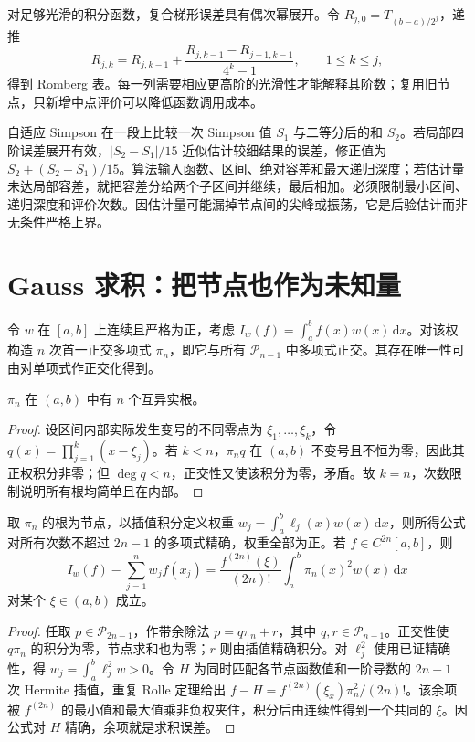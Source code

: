 \documentclass[UTF8,12pt,a4paper,fontset=fandol]{ctexbook}
\begin{document}
对足够光滑的积分函数，复合梯形误差具有偶次幂展开。令 $R_{j,0}=T_{(b-a)/2^j}$，递推
\[
 R_{j,k}=R_{j,k-1}+\frac{R_{j,k-1}-R_{j-1,k-1}}{4^k-1},\qquad1\le k\le j,
\]
得到 Romberg 表。每一列需要相应更高阶的光滑性才能解释其阶数；复用旧节点，只新增中点评价可以降低函数调用成本。

自适应 Simpson 在一段上比较一次 Simpson 值 $S_1$ 与二等分后的和 $S_2$。若局部四阶误差展开有效，$|S_2-S_1|/15$ 近似估计较细结果的误差，修正值为 $S_2+(S_2-S_1)/15$。算法输入函数、区间、绝对容差和最大递归深度；若估计量未达局部容差，就把容差分给两个子区间并继续，最后相加。必须限制最小区间、递归深度和评价次数。因估计量可能漏掉节点间的尖峰或振荡，它是后验估计而非无条件严格上界。

\section{Gauss 求积：把节点也作为未知量}
令 $w$ 在 $[a,b]$ 上连续且严格为正，考虑 $I_w(f)=\int_a^bf(x)w(x)\,\mathrm dx$。对该权构造 $n$ 次首一正交多项式 $\pi_n$，即它与所有 $\mathcal P_{n-1}$ 中多项式正交。其存在唯一性可由对单项式作正交化得到。

\begin{lemma}[正交多项式的零点]
$\pi_n$ 在 $(a,b)$ 中有 $n$ 个互异实根。
\end{lemma}
\begin{proof}
设区间内部实际发生变号的不同零点为 $\xi_1,\ldots,\xi_k$，令 $q(x)=\prod_{j=1}^k(x-\xi_j)$。若 $k<n$，$\pi_nq$ 在 $(a,b)$ 不变号且不恒为零，因此其正权积分非零；但 $\deg q<n$，正交性又使该积分为零，矛盾。故 $k=n$，次数限制说明所有根均简单且在内部。
\end{proof}

\begin{theorem}
\label{thm:na-gauss}
取 $\pi_n$ 的根为节点，以插值积分定义权重 $w_j=\int_a^b\ell_j(x)w(x)\,\mathrm dx$，则所得公式对所有次数不超过 $2n-1$ 的多项式精确，权重全部为正。若 $f\in C^{2n}[a,b]$，则
\[
 I_w(f)-\sum_{j=1}^nw_jf(x_j)
 =\frac{f^{(2n)}(\xi)}{(2n)!}\int_a^b\pi_n(x)^2w(x)\,\mathrm dx
\]
对某个 $\xi\in(a,b)$ 成立。
\end{theorem}
\begin{proof}
任取 $p\in\mathcal P_{2n-1}$，作带余除法 $p=q\pi_n+r$，其中 $q,r\in\mathcal P_{n-1}$。正交性使 $q\pi_n$ 的积分为零，节点求和也为零；$r$ 则由插值精确积分。对 $\ell_j^2$ 使用已证精确性，得 $w_j=\int_a^b\ell_j^2w>0$。令 $H$ 为同时匹配各节点函数值和一阶导数的 $2n-1$ 次 Hermite 插值，重复 Rolle 定理给出 $f-H=f^{(2n)}(\xi_x)\pi_n^2/(2n)!$。该余项被 $f^{(2n)}$ 的最小值和最大值乘非负权夹住，积分后由连续性得到一个共同的 $\xi$。因公式对 $H$ 精确，余项就是求积误差。
\end{proof}
\end{document}
